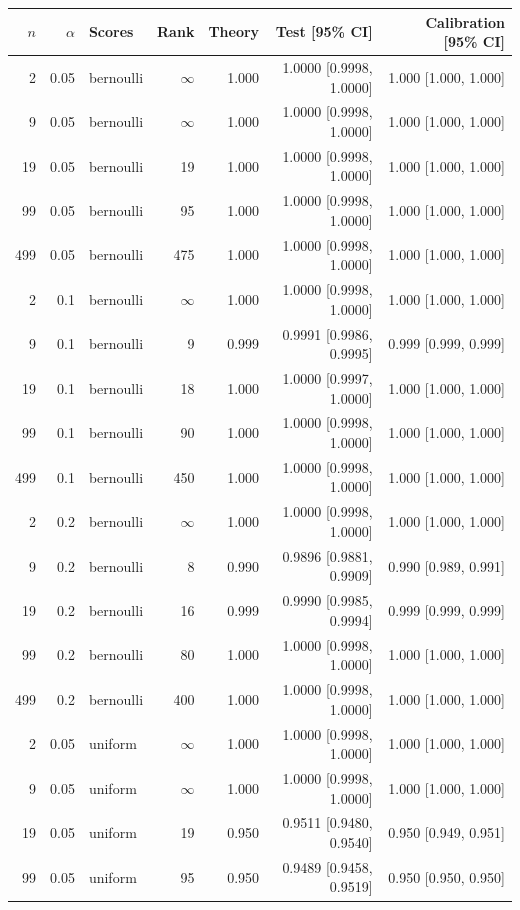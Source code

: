 \begin{longtable}{rrlrrrr}
\toprule
$n$ & $\alpha$ & Scores & Rank & Theory & Test [95\% CI] & Calibration [95\% CI] \\
\midrule
\endhead
2 & 0.05 & bernoulli & $\infty$ & 1.000 & 1.0000 [0.9998, 1.0000] & 1.000 [1.000, 1.000] \\
9 & 0.05 & bernoulli & $\infty$ & 1.000 & 1.0000 [0.9998, 1.0000] & 1.000 [1.000, 1.000] \\
19 & 0.05 & bernoulli & 19 & 1.000 & 1.0000 [0.9998, 1.0000] & 1.000 [1.000, 1.000] \\
99 & 0.05 & bernoulli & 95 & 1.000 & 1.0000 [0.9998, 1.0000] & 1.000 [1.000, 1.000] \\
499 & 0.05 & bernoulli & 475 & 1.000 & 1.0000 [0.9998, 1.0000] & 1.000 [1.000, 1.000] \\
2 & 0.1 & bernoulli & $\infty$ & 1.000 & 1.0000 [0.9998, 1.0000] & 1.000 [1.000, 1.000] \\
9 & 0.1 & bernoulli & 9 & 0.999 & 0.9991 [0.9986, 0.9995] & 0.999 [0.999, 0.999] \\
19 & 0.1 & bernoulli & 18 & 1.000 & 1.0000 [0.9997, 1.0000] & 1.000 [1.000, 1.000] \\
99 & 0.1 & bernoulli & 90 & 1.000 & 1.0000 [0.9998, 1.0000] & 1.000 [1.000, 1.000] \\
499 & 0.1 & bernoulli & 450 & 1.000 & 1.0000 [0.9998, 1.0000] & 1.000 [1.000, 1.000] \\
2 & 0.2 & bernoulli & $\infty$ & 1.000 & 1.0000 [0.9998, 1.0000] & 1.000 [1.000, 1.000] \\
9 & 0.2 & bernoulli & 8 & 0.990 & 0.9896 [0.9881, 0.9909] & 0.990 [0.989, 0.991] \\
19 & 0.2 & bernoulli & 16 & 0.999 & 0.9990 [0.9985, 0.9994] & 0.999 [0.999, 0.999] \\
99 & 0.2 & bernoulli & 80 & 1.000 & 1.0000 [0.9998, 1.0000] & 1.000 [1.000, 1.000] \\
499 & 0.2 & bernoulli & 400 & 1.000 & 1.0000 [0.9998, 1.0000] & 1.000 [1.000, 1.000] \\
2 & 0.05 & uniform & $\infty$ & 1.000 & 1.0000 [0.9998, 1.0000] & 1.000 [1.000, 1.000] \\
9 & 0.05 & uniform & $\infty$ & 1.000 & 1.0000 [0.9998, 1.0000] & 1.000 [1.000, 1.000] \\
19 & 0.05 & uniform & 19 & 0.950 & 0.9511 [0.9480, 0.9540] & 0.950 [0.949, 0.951] \\
99 & 0.05 & uniform & 95 & 0.950 & 0.9489 [0.9458, 0.9519] & 0.950 [0.950, 0.950] \\

\end{longtable}
